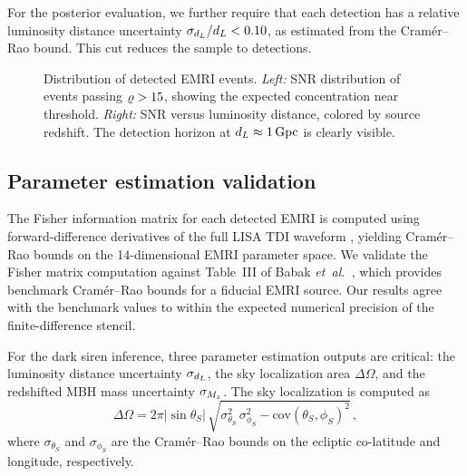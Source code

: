 For the posterior evaluation, we further require that each detection has a
relative luminosity distance uncertainty
$\sigma_{d_L}/d_L < 0.10$, as estimated from the Cram\'{e}r--Rao
bound. This cut reduces the sample to
 detections.

\begin{figure}[t]
  \centering
  \caption{Distribution of detected EMRI events. \emph{Left:} SNR
  distribution of events passing $\varrho > 15$, showing the expected
  concentration near threshold. \emph{Right:} SNR versus luminosity
  distance, colored by source redshift. The detection horizon at
  $d_L \approx 1\,\mathrm{Gpc}$ is clearly visible.}
  \label{fig:snr_distribution}
\end{figure}

\subsection{Parameter estimation validation}
\label{sec:pe_validation}

The Fisher information matrix for each detected EMRI is computed using
forward-difference derivatives of the full LISA TDI waveform
\cite{Vallisneri:2007ev}, yielding Cram\'{e}r--Rao bounds on the
14-dimensional EMRI parameter space. We validate the Fisher matrix
computation against Table~III of Babak
\emph{et~al.}~\cite{Babak:2017tow}, which provides benchmark
Cram\'{e}r--Rao bounds for a fiducial EMRI source. Our results agree with
the benchmark values to within the expected numerical precision of the
finite-difference stencil.

For the dark siren inference, three parameter estimation outputs are
critical: the luminosity distance uncertainty $\sigma_{d_L}$, the sky
localization area $\Delta\Omega$, and the redshifted MBH mass uncertainty
$\sigma_{M_z}$. The sky localization is computed as
\begin{equation}
  \Delta\Omega = 2\pi |\sin\theta_S| \,
  \sqrt{\sigma_{\theta_S}^2 \, \sigma_{\phi_S}^2
    - \mathrm{cov}(\theta_S, \phi_S)^2} \,,
  \label{eq:sky_localization}
\end{equation}
where $\sigma_{\theta_S}$ and $\sigma_{\phi_S}$ are the
Cram\'{e}r--Rao bounds on the ecliptic co-latitude and longitude,
respectively.


